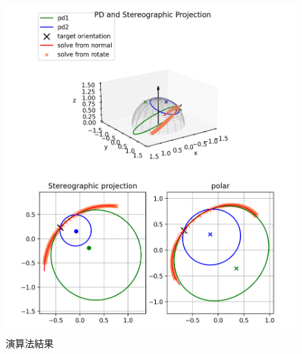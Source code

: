 \begin{figure}[ht]
    \centering
    \includegraphics[width=12cm]{ch3pic/solve_targetori.png}
    \caption{演算法結果}
    \label{solve_ori}
\end{figure}




